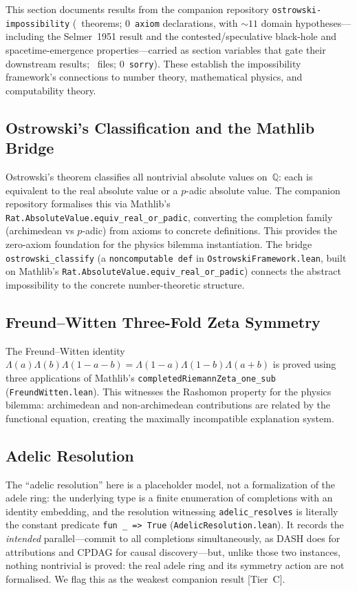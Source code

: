 \documentclass[11pt,a4paper]{article}
\begin{document}
This section documents results from the companion repository \texttt{ostrowski-impossibility} (\ClaimOstrowskiTheorems~theorems; 0~\texttt{axiom} declarations, with ${\sim}11$ domain hypotheses---including the Selmer~1951 result and the contested/speculative black-hole and spacetime-emergence properties---carried as section variables that gate their downstream results; \ClaimOstrowskiFiles~files; 0~\texttt{sorry}).  These establish the impossibility framework's connections to number theory, mathematical physics, and computability theory.

\subsection{Ostrowski's Classification and the Mathlib Bridge}

Ostrowski's theorem classifies all nontrivial absolute values on~$\mathbb{Q}$: each is equivalent to the real absolute value or a $p$-adic absolute value.  The companion repository formalises this via Mathlib's \texttt{Rat.AbsoluteValue.equiv\_real\_or\_padic}, converting the completion family (archimedean vs $p$-adic) from axioms to concrete definitions.  This provides the zero-axiom foundation for the physics bilemma instantiation.  The bridge \texttt{ostrowski\_classify} (a \texttt{noncomputable def} in \texttt{OstrowskiFramework.lean}, built on Mathlib's \texttt{Rat.AbsoluteValue.equiv\_real\_or\_padic}) connects the abstract impossibility to the concrete number-theoretic structure.

\subsection{Freund--Witten Three-Fold Zeta Symmetry}

The Freund--Witten identity
$\Lambda(a)\Lambda(b)\Lambda(1{-}a{-}b) = \Lambda(1{-}a)\Lambda(1{-}b)\Lambda(a{+}b)$
is proved using three applications of Mathlib's \texttt{completedRiemannZeta\_one\_sub} (\texttt{FreundWitten.lean}).  This witnesses the Rashomon property for the physics bilemma: archimedean and non-archimedean contributions are related by the functional equation, creating the maximally incompatible explanation system.

\subsection{Adelic Resolution}

The ``adelic resolution'' here is a placeholder model, not a formalization of the adele ring: the underlying type is a finite enumeration of completions with an identity embedding, and the resolution witnessing \texttt{adelic\_resolves} is literally the constant predicate \texttt{fun \_ => True} (\texttt{AdelicResolution.lean}).  It records the \emph{intended} parallel---commit to all completions simultaneously, as DASH does for attributions and CPDAG for causal discovery---but, unlike those two instances, nothing nontrivial is proved: the real adele ring and its symmetry action are not formalised.  We flag this as the weakest companion result [Tier~C].
\end{document}
